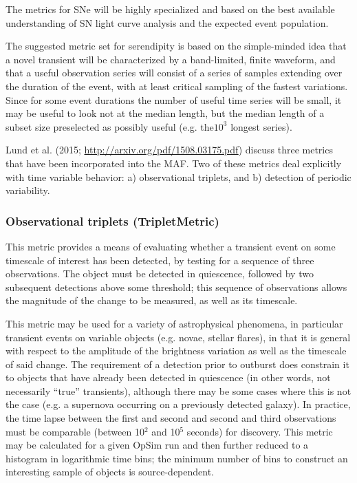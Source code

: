 The metrics for SNe will be highly specialized and based on the best available understanding of SN light curve analysis and the expected event population.

The suggested metric set for serendipity is based on the simple-minded idea that a novel transient will be characterized by a band-limited, finite waveform, and that a useful observation series will consist of a series of samples extending over the duration of the event, with at least critical sampling of the fastest variations.  Since for some event durations the number of useful time series will be small, it may be useful to look not at the median length, but the median length of a subset size preselected as possibly useful (e.g. the$10^3$ longest series).

Lund et al. (2015; \url{http://arxiv.org/pdf/1508.03175.pdf}) discuss three metrics that have been incorporated into the MAF. Two of these metrics deal explicitly with time variable behavior: a) observational triplets, and b) detection of periodic variability.

\subsubsection{Observational triplets (TripletMetric)}

This metric provides a means of evaluating whether a transient event on some timescale of interest has been detected, by testing for a sequence of three observations. The object must be detected in quiescence, followed by two subsequent detections above some threshold; this sequence of observations allows the magnitude of the change to be measured, as well as its timescale.

This metric may be used for a variety of astrophysical phenomena, in particular transient events on variable objects (e.g. novae, stellar flares), in that it is general with respect to the amplitude of the brightness variation as well as the timescale of said change. The requirement of a detection prior to outburst does constrain it to objects that have already been detected in quiescence (in other words, not necessarily ``true'' transients), although there may be some cases where this is not the case (e.g. a supernova occurring on a previously detected galaxy). In practice, the time lapse between the first and second and second and third observations must be comparable (between 10$^2$ and 10$^5$ seconds) for discovery. This metric may be calculated for a given OpSim run and then further reduced to a histogram in logarithmic time bins; the minimum number of bins to construct an interesting sample of objects is source-dependent.

